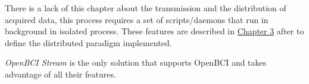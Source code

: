 There is a lack of this chapter about the transmission and the distribution of acquired data, this process requires a set of scripts/daemons that run in background in isolated process. These features are described in \hyperref[ch:chapter_3]{Chapter 3} after to define the distributed paradigm implemented.

\textit{OpenBCI Stream} is the only solution that supports OpenBCI and takes advantage of all their features.